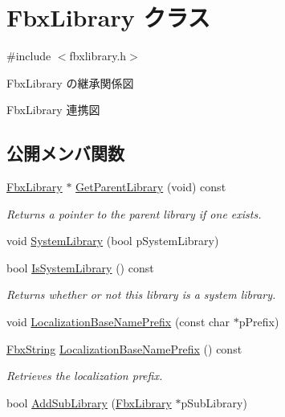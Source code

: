 \hypertarget{class_fbx_library}{}\section{Fbx\+Library クラス}
\label{class_fbx_library}


{\ttfamily \#include $<$fbxlibrary.\+h$>$}



Fbx\+Library の継承関係図


Fbx\+Library 連携図
\subsection*{公開メンバ関数}
\begin{DoxyCompactItemize}
\item 
\hyperlink{class_fbx_library}{Fbx\+Library} $\ast$ \hyperlink{class_fbx_library_a8733a34df39aefd786bd792ee646d3ca}{Get\+Parent\+Library} (void) const
\begin{DoxyCompactList}\small\item\em Returns a pointer to the parent library if one exists. \end{DoxyCompactList}\item 
void \hyperlink{class_fbx_library_a4746780aa4ba19fdbf1462fb371967c9}{System\+Library} (bool p\+System\+Library)
\item 
bool \hyperlink{class_fbx_library_ad0e5e2ea87d5a993ed5a70a27671f9ac}{Is\+System\+Library} () const
\begin{DoxyCompactList}\small\item\em Returns whether or not this library is a system library. \end{DoxyCompactList}\item 
void \hyperlink{class_fbx_library_a31ee4d35fbd0ae97fdb0470a487ae5ff}{Localization\+Base\+Name\+Prefix} (const char $\ast$p\+Prefix)
\item 
\hyperlink{class_fbx_string}{Fbx\+String} \hyperlink{class_fbx_library_acfd1439811766c38c8b3fce758787603}{Localization\+Base\+Name\+Prefix} () const
\begin{DoxyCompactList}\small\item\em Retrieves the localization prefix. \end{DoxyCompactList}\item 
bool \hyperlink{class_fbx_library_a0c3b1e44376fbbad1d85d35aadcedec4}{Add\+Sub\+Library} (\hyperlink{class_fbx_library}{Fbx\+Library} $\ast$p\+Sub\+Library)
\item 

\end{DoxyCompactItemize}
